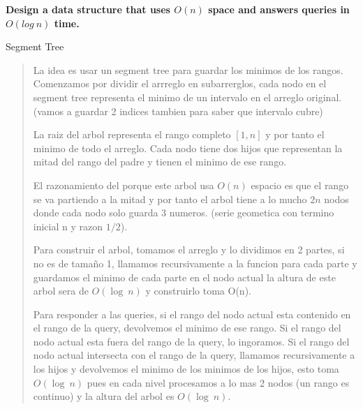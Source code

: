 \textbf{Design a data structure that uses $O(n)$ space and answers queries in $O(log \ n)$ time.}\vspace{.2cm}

\textcolor{bibi}{Segment Tree}
\begin{quote}
    La idea es usar un segment tree para guardar los minimos de los rangos. Comenzamos por dividir el arrreglo en subarrerglos, cada nodo en el segment tree representa el minimo de un intervalo en el arreglo original. (vamos a guardar 2 indices tambien para saber que intervalo cubre) \vspace{.2cm}

    La raiz del arbol representa el rango completo $[1, n]$ y por tanto el minimo de todo el arreglo. Cada nodo tiene dos hijos que representan la mitad del rango del padre y tienen el minimo de ese rango. \vspace{.2cm}

    El razonamiento del porque este arbol usa $O(n)$ espacio es que el rango se va partiendo a la mitad y por tanto el arbol tiene a lo mucho $2n$ nodos donde cada nodo solo guarda 3 numeros. (serie geometica con termino inicial n y razon $1/2$). \vspace{.2cm}

    Para construir el arbol, tomamos el arreglo y lo dividimos en 2 partes, si no es de tamaño 1, llamamos recursivamente a la funcion para cada parte y guardamos el minimo de cada parte en el nodo actual la altura de este arbol sera de $O(\log \ n)$ y construirlo toma O(n). \vspace{.2cm}

    Para responder a las queries, si el rango del nodo actual esta contenido en el rango de la query, devolvemos el minimo de ese rango. Si el rango del nodo actual esta fuera del rango de la query, lo ingoramos. Si el rango del nodo actual intersecta con el rango de la query, llamamos recursivamente a los hijos y devolvemos el minimo de los minimos de los hijos, esto toma $O(\log \ n)$ pues en cada nivel procesamos a lo mas 2 nodos (un rango es continuo) y la altura del arbol es $O(\log \ n)$. \vspace{.2cm}
\end{quote}